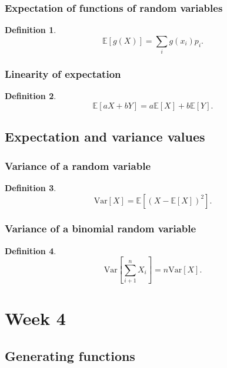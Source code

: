 \documentclass{article}
\newtheorem{definition}{Definition}
\newcommand{\E}{\mathbb{E}}
\newcommand{\Var}{\text{Var}}
\begin{document}
\subsubsection{Expectation of functions of random variables}
\begin{definition}
    \begin{equation}
        \E[g(X)] = \sum_i g(x_i)p_i.
    \end{equation}
\end{definition}
\subsubsection{Linearity of expectation}
\begin{definition}
    \begin{equation}
        \E[aX+bY] = a\E[X]+b\E[Y].
    \end{equation}
\end{definition}


\subsection{Expectation and variance values}
\subsubsection{Variance of a random variable}
\begin{definition}
    \begin{equation}
        \Var[X] =\E[(X-\E[X])^2]. 
    \end{equation}
\end{definition}

\subsubsection{Variance of a binomial random variable}
\begin{definition}
    \begin{equation}
        \Var[\sum_{i+1}^n X_i] = n\Var[X].
    \end{equation}
\end{definition}

\section{Week 4}
\subsection{Generating functions}
\end{document}
